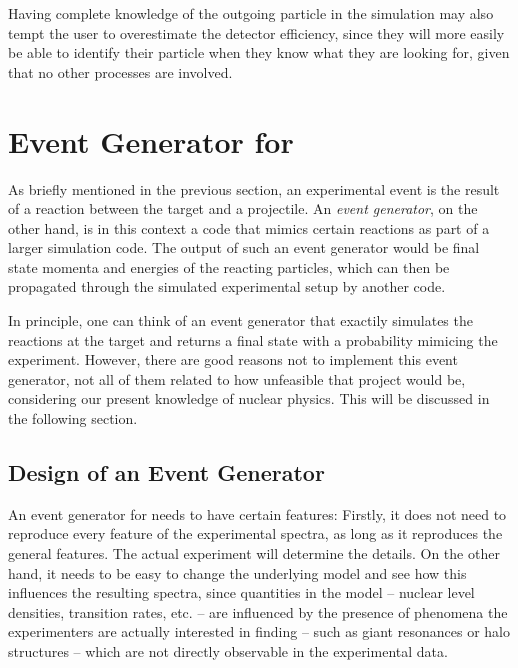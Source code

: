 Having complete knowledge of the outgoing particle in the simulation may also tempt the user to overestimate the detector efficiency, since they will more easily be able to identify their particle when they know what they are looking for, given that no other processes are involved.

\section{Event Generator for \rtb{}}
As briefly mentioned in the previous section, an experimental event is the result of a reaction between the target and a projectile.
An \emph{event generator}, on the other hand, is in this context a code that mimics certain reactions as part of a larger simulation code. The output of such an event generator would be final state momenta and energies of the reacting particles, which can then be propagated through the simulated experimental setup by another code. %

In principle, one can think of an event generator that exactily simulates the reactions at the target and returns a final state with a probability mimicing the experiment. However, there are good reasons not to implement this event generator, not all of them related to how unfeasible that project would be, considering our present knowledge of nuclear physics. This will be discussed in the following section.


\subsection{Design of an Event Generator}
An event generator for \rtb{} needs to have certain features:
Firstly, it does not need to reproduce every feature of the experimental spectra, as long as it reproduces the general features. The actual experiment will determine the details.
On the other hand, it needs to be easy to change the underlying model and see how this influences the resulting spectra, since quantities in the model -- nuclear level densities, transition rates, etc. -- are influenced by the presence of phenomena the experimenters are actually interested in finding -- such as giant resonances or halo structures -- which are not directly observable in the experimental data.
 
